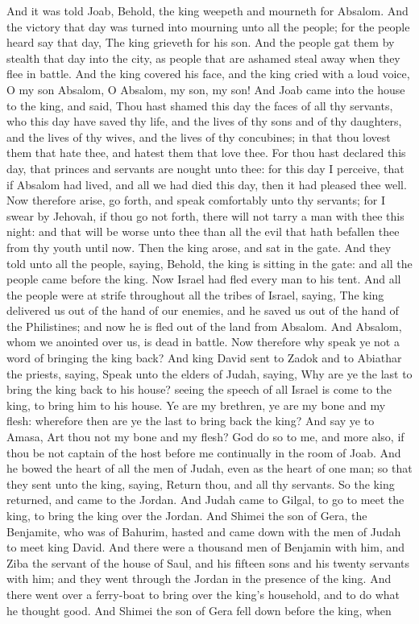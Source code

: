 And it was told Joab, Behold, the king weepeth and mourneth for Absalom. And the victory that day was turned into mourning unto all the people; for the people heard say that day, The king grieveth for his son. And the people gat them by stealth that day into the city, as people that are ashamed steal away when they flee in battle. And the king covered his face, and the king cried with a loud voice, O my son Absalom, O Absalom, my son, my son! And Joab came into the house to the king, and said, Thou hast shamed this day the faces of all thy servants, who this day have saved thy life, and the lives of thy sons and of thy daughters, and the lives of thy wives, and the lives of thy concubines; in that thou lovest them that hate thee, and hatest them that love thee. For thou hast declared this day, that princes and servants are nought unto thee: for this day I perceive, that if Absalom had lived, and all we had died this day, then it had pleased thee well. Now therefore arise, go forth, and speak comfortably unto thy servants; for I swear by Jehovah, if thou go not forth, there will not tarry a man with thee this night: and that will be worse unto thee than all the evil that hath befallen thee from thy youth until now. Then the king arose, and sat in the gate. And they told unto all the people, saying, Behold, the king is sitting in the gate: and all the people came before the king. Now Israel had fled every man to his tent. And all the people were at strife throughout all the tribes of Israel, saying, The king delivered us out of the hand of our enemies, and he saved us out of the hand of the Philistines; and now he is fled out of the land from Absalom. And Absalom, whom we anointed over us, is dead in battle. Now therefore why speak ye not a word of bringing the king back?  And king David sent to Zadok and to Abiathar the priests, saying, Speak unto the elders of Judah, saying, Why are ye the last to bring the king back to his house? seeing the speech of all Israel is come to the king, to bring him to his house. Ye are my brethren, ye are my bone and my flesh: wherefore then are ye the last to bring back the king? And say ye to Amasa, Art thou not my bone and my flesh? God do so to me, and more also, if thou be not captain of the host before me continually in the room of Joab. And he bowed the heart of all the men of Judah, even as the heart of one man; so that they sent unto the king, saying, Return thou, and all thy servants. So the king returned, and came to the Jordan. And Judah came to Gilgal, to go to meet the king, to bring the king over the Jordan.  And Shimei the son of Gera, the Benjamite, who was of Bahurim, hasted and came down with the men of Judah to meet king David. And there were a thousand men of Benjamin with him, and Ziba the servant of the house of Saul, and his fifteen sons and his twenty servants with him; and they went through the Jordan in the presence of the king. And there went over a ferry-boat to bring over the king’s household, and to do what he thought good. And Shimei the son of Gera fell down before the king, when 